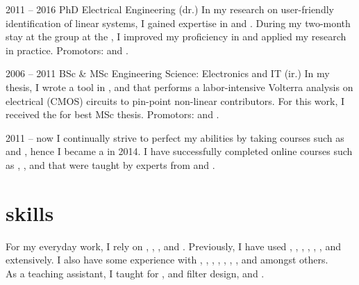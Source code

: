 \documentclass{cv-egeerardyn}
\begin{document}
\begin{education}
  \addEducation%
  {2011 -- 2016}%
  {PhD Electrical Engineering (dr.)}%
  {\VUB}%
  {In my research on user-friendly identification of linear systems, I gained expertise in  and . During my two-month stay at the \CST{} group at the \TUe, I improved my proficiency in  and applied my research in practice.
  Promotors: \JohanSchoukens{} and \TomOomen.}

  \addEducation%
  {2006 -- 2011}%
  {BSc \& MSc Engineering Science: Electronics  and IT (ir.)}%
  {\VUB}%
  {In my thesis, I wrote a tool in ,  and  that performs a labor-intensive Volterra analysis on electrical (CMOS) circuits to pin-point non-linear contributors.
  For this work, I received the  for best MSc thesis.
  Promotors: \PietWambacq{} and \GerdVandersteen.}

  \addText%
  {\vspace{-5.35\baselineskip}2011 -- now}%
  {I continually strive to perfect my abilities by taking courses such as  and , hence I became a  in 2014. 
  I have successfully completed online courses such as 
     , 
     , 
      and 
  that were taught by experts from \Stanford{} and \EPFL{}.}
\end{education}

\begin{languages}
\end{languages}

\section{skills}
For my everyday work, I rely on , ,  , and .
Previously, I have used , , , , , , and  extensively.
I also have some experience with , , , , , , , and  amongst others.\\
As a teaching assistant, I taught  for ,  and filter design, and .
\end{document}
